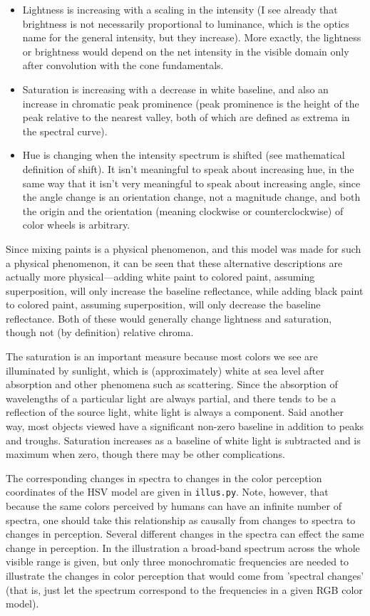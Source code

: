 \documentclass{article}
\begin{document}
\begin{itemize}
\item Lightness is increasing with a scaling in the intensity (I see already
that brightness is not necessarily proportional to luminance, which is the
optics name for the general intensity, but they increase). More exactly, the
lightness or brightness would depend on the net intensity in the visible domain
only after convolution with the cone fundamentals.
\item Saturation is increasing with a decrease in white baseline, and also an
increase in chromatic peak prominence (peak prominence is the height of the
peak relative to the nearest valley, both of which are defined as extrema in
the spectral curve).
\item Hue is changing when the intensity spectrum is shifted (see mathematical
definition of shift). It isn't meaningful to speak about increasing hue, in the
same way that it isn't very meaningful to speak about increasing angle, since
the angle change is an orientation change, not a magnitude change, and both the
origin and the orientation (meaning clockwise or counterclockwise) of color
wheels is arbitrary.
\end{itemize}

Since mixing paints is a physical phenomenon, and this model was made for such
a physical phenomenon, it can be seen that these alternative descriptions are
actually more physical---adding white paint to colored paint, assuming
superposition, will only increase the baseline reflectance, while adding black
paint to colored paint, assuming superposition, will only decrease the baseline
reflectance. Both of these would generally change lightness and saturation,
though not (by definition) relative chroma.

The saturation is an important measure because most colors we see are
illuminated by sunlight, which is (approximately) white at sea level after
absorption and other phenomena such as scattering. Since the absorption of
wavelengths of a particular light are always partial, and there tends to be a
reflection of the source light, white light is always a component. Said another
way, most objects viewed have a significant non-zero baseline in addition to
peaks and troughs. Saturation increases as a baseline of white light is
subtracted and is maximum when zero, though there may be other complications.

The corresponding changes in spectra to changes in the color perception
coordinates of the HSV model are given in \texttt{illus.py}. Note, however,
that because the same colors perceived by humans can have an infinite number of
spectra, one should take this relationship as causally from changes to spectra
to changes in perception. Several different changes in the spectra can effect
the same change in perception. In the illustration a broad-band spectrum across
the whole visible range is given, but only three monochromatic frequencies are
needed to illustrate the changes in color perception that would come from
'spectral changes' (that is, just let the spectrum correspond to the
frequencies in a given RGB color model).
\end{document}

